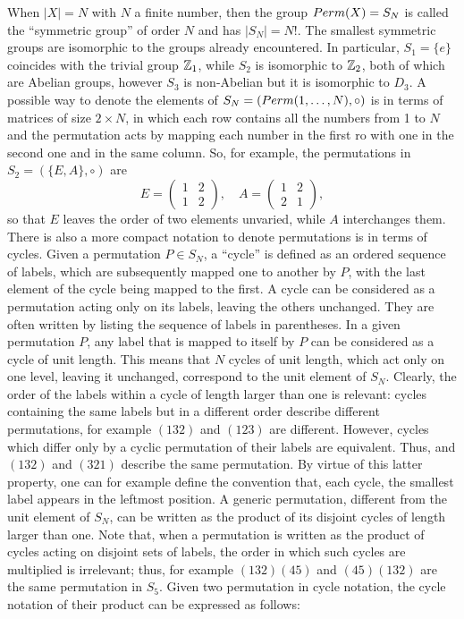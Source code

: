 When $|X| = N$ with $N$ a finite number, then the group ${Perm}(X) = S_N$ is called the ``symmetric group'' of order $N$ and has $|S_N| = N!$. The smallest symmetric groups are isomorphic to the groups already encountered. In particular, $S_1 = \{e\}$ coincides with the trivial group $\mathbb{Z}_1$, while $S_2$ is isomorphic to $\mathbb{Z}_2$, both of which are Abelian groups, however $S_3$ is non-Abelian but it is isomorphic to $D_3$. A possible way to denote the elements of $S_N = ({Perm}(1,\dots,N),\circ)$ is in terms of matrices of size $2 \times N$, in which each row contains all the numbers from 1 to $N$ and the permutation acts by mapping each number in the first ro with one in the second one and in the same column. So, for example, the permutations in $S_2 = (\{E,A\},\circ)$ are
\begin{equation}
    E = 
    \begin{pmatrix}
        1 & 2 \\
        1 & 2
    \end{pmatrix}
    ,\quad
    A =
    \begin{pmatrix}
        1 & 2 \\
        2 & 1
    \end{pmatrix},
\end{equation}
so that $E$ leaves the order of two elements unvaried, while $A$ interchanges them. There is also a more compact notation to denote permutations is in terms of cycles. Given a permutation $P \in S_N$, a ``cycle'' is defined as an ordered sequence of labels, which are subsequently mapped one to another by $P$, with the last element of the cycle being mapped to the first. A cycle can be considered as a permutation acting only on its labels, leaving the others unchanged. They are often written by listing the sequence of labels in parentheses. In a given permutation $P$, any label that is mapped to itself by $P$ can be considered as a cycle of unit length. This means that $N$ cycles of unit length, which act only on one level, leaving it unchanged, correspond to the unit element of $S_N$. Clearly, the order of the labels within a cycle of length larger than one is relevant: cycles containing the same labels but in a different order describe different permutations, for example $(132)$ and $(123)$ are different. However, cycles which differ only by a cyclic permutation of their labels are equivalent. Thus, and $(132)$ and $(321)$ describe the same permutation. By virtue of this latter property, one can for example define the convention that, each cycle, the smallest label appears in the leftmost position. A generic permutation, different from the unit element of $S_N$, can be written as the product of its disjoint cycles of length larger than one. Note that, when a permutation is written as the product of cycles acting on disjoint sets of labels, the order in which such cycles are multiplied is irrelevant; thus, for example $(132)(45)$ and $(45)(132)$ are the same permutation in $S_5$. Given two permutation in cycle notation, the cycle notation of their product can be expressed as follows:

